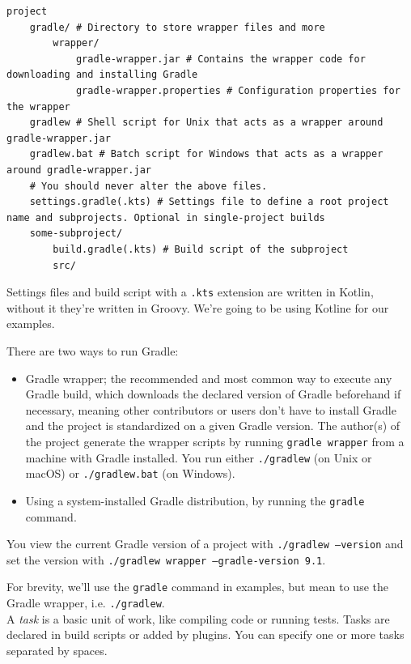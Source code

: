 \documentclass[table, xcdraw]{article}%
\begin{document}
\begin{verbatim}
project
    gradle/ # Directory to store wrapper files and more
        wrapper/ 
            gradle-wrapper.jar # Contains the wrapper code for downloading and installing Gradle
            gradle-wrapper.properties # Configuration properties for the wrapper
    gradlew # Shell script for Unix that acts as a wrapper around gradle-wrapper.jar
    gradlew.bat # Batch script for Windows that acts as a wrapper around gradle-wrapper.jar
    # You should never alter the above files.
    settings.gradle(.kts) # Settings file to define a root project name and subprojects. Optional in single-project builds
    some-subproject/
        build.gradle(.kts) # Build script of the subproject
        src/
\end{verbatim}

Settings files and build script with a \texttt{.kts} extension are written in Kotlin, without it they're written in Groovy. We're going to be using Kotline for our examples.

There are two ways to run Gradle:

\begin{itemize}
    \item Gradle wrapper; the recommended and most common way to execute any Gradle build, which downloads the declared version of Gradle beforehand if necessary, meaning other contributors or users don't have to install Gradle and the project is standardized on a given Gradle version. The author(s) of the project generate the wrapper scripts by running \texttt{gradle wrapper} from a machine with Gradle installed. You run either \texttt{./gradlew} (on Unix or macOS) or \texttt{./gradlew.bat} (on Windows).
    \item Using a system-installed Gradle distribution, by running the \texttt{gradle} command.
\end{itemize}

You view the current Gradle version of a project with \texttt{./gradlew --version} and set the version with \texttt{./gradlew wrapper --gradle-version 9.1}.

For brevity, we'll use the \texttt{gradle} command in examples, but mean to use the Gradle wrapper, i.e. \texttt{./gradlew}.\\
A \emph{task} is a basic unit of work, like compiling code or running tests. Tasks are declared in build scripts or added by plugins. You can specify one or more tasks separated by spaces.
\end{document}
